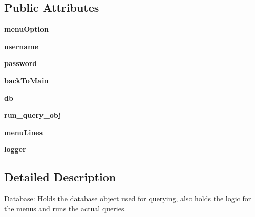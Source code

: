 \subsection*{Public Attributes}
\begin{DoxyCompactItemize}
\item 
\hypertarget{class_my_s_q_l_database_1_1_my_s_q_l_database_ae53f2dc61fcf32ccc89c5a65a3cf339e}{}\label{class_my_s_q_l_database_1_1_my_s_q_l_database_ae53f2dc61fcf32ccc89c5a65a3cf339e} 
{\bfseries menu\+Option}
\item 
\hypertarget{class_my_s_q_l_database_1_1_my_s_q_l_database_a5c64210f80c8a8fcfcc91dd0bf8150fa}{}\label{class_my_s_q_l_database_1_1_my_s_q_l_database_a5c64210f80c8a8fcfcc91dd0bf8150fa} 
{\bfseries username}
\item 
\hypertarget{class_my_s_q_l_database_1_1_my_s_q_l_database_a495a5f090202b50929b3efaa439e5c48}{}\label{class_my_s_q_l_database_1_1_my_s_q_l_database_a495a5f090202b50929b3efaa439e5c48} 
{\bfseries password}
\item 
\hypertarget{class_my_s_q_l_database_1_1_my_s_q_l_database_a786b536b34b946de38df9d9f21cee5a3}{}\label{class_my_s_q_l_database_1_1_my_s_q_l_database_a786b536b34b946de38df9d9f21cee5a3} 
{\bfseries back\+To\+Main}
\item 
\hypertarget{class_my_s_q_l_database_1_1_my_s_q_l_database_a8b542c607678f5e7b5374729ea8ec3a3}{}\label{class_my_s_q_l_database_1_1_my_s_q_l_database_a8b542c607678f5e7b5374729ea8ec3a3} 
{\bfseries db}
\item 
\hypertarget{class_my_s_q_l_database_1_1_my_s_q_l_database_ae41a0779e98d868bc7ec66f5f3f6fc74}{}\label{class_my_s_q_l_database_1_1_my_s_q_l_database_ae41a0779e98d868bc7ec66f5f3f6fc74} 
{\bfseries run\+\_\+query\+\_\+obj}
\item 
\hypertarget{class_my_s_q_l_database_1_1_my_s_q_l_database_ac712f257d654fe875e310818c7eb323f}{}\label{class_my_s_q_l_database_1_1_my_s_q_l_database_ac712f257d654fe875e310818c7eb323f} 
{\bfseries menu\+Lines}
\item 
\hypertarget{class_my_s_q_l_database_1_1_my_s_q_l_database_a6d93b8694aab750cb9138294e2046dec}{}\label{class_my_s_q_l_database_1_1_my_s_q_l_database_a6d93b8694aab750cb9138294e2046dec} 
{\bfseries logger}
\end{DoxyCompactItemize}


\subsection{Detailed Description}
\begin{DoxyVerb}Database: Holds the database object used for querying, also holds the
    logic for the menus and runs the actual queries. \end{DoxyVerb}
 

